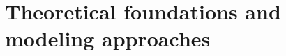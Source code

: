 \documentclass[a4paper,12pt]{report}
\begin{document}
\setcounter{chapter}{1}
\chapter{Theoretical foundations and modeling approaches}

\printbibliography
\end{document}
